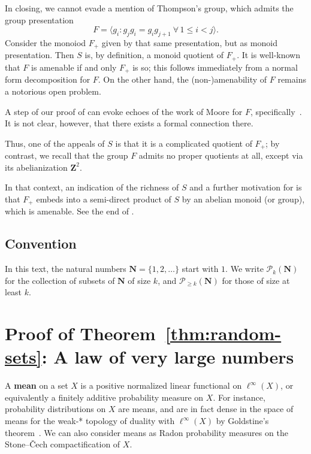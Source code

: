 \documentclass[12pt, pdflatex]{amsart}
\theoremstyle{definition}
\numberwithin{equation}{section}
\numberwithin{theorem}{section}
\newcommand{\NN}{\mathbf{N}}
\newcommand{\ZZ}{\mathbf{Z}}
\newcommand{\sP}{\mathscr{P}}
\begin{document}
\medskip
In closing, we cannot evade a mention of Thompson's group, which admits the group presentation
\begin{equation*}
F = \big\langle g_i : g_j g_i = g_i g_{j+1} \ \forall\, 1\leq i < j  \big\rangle.
\end{equation*}
Consider the monoiod $F_+$ given by that same presentation, but as monoid presentation. Then $S$ is, by definition, a monoid quotient of $F_+$. It is well-known that $F$ is amenable if and only $F_+$ is so; this follows immediately from a normal form decomposition for $F$. On the other hand, the (non-)amenability of $F$ remains a notorious open problem.

A step of our proof of  can evoke echoes of the work of Moore for $F$, specifically~\cites{Moore_hindman,Moore_idem}. It is not clear, however, that there exists a formal connection there.

Thus, one of the appeals of $S$ is that it is a complicated quotient of $F_+$; by contrast, we recall that the group $F$ admits no proper quotients at all, except via its abelianization $\ZZ^2$.

In that context, an indication of the richness of $S$ and a further motivation for  is that $F_+$ embeds into a semi-direct product of $S$ by an abelian monoid (or group), which is amenable. See the end of .



\subsection*{Convention}
In this text, the natural numbers $\NN=\{1, 2, \ldots \}$ start with $1$. We write $\sP_k(\NN)$ for the collection of subsets of $\NN$ of size $k$, and $\sP_{\geq k}(\NN)$ for those of size at least $k$.

\section{Proof of Theorem~\ref{thm:random-sets}: A law of very large numbers}\label{sec:idem}
A \textbf{mean} on a set $X$ is a positive normalized linear functional on $\ell^\infty(X)$, or equivalently a finitely additive probability measure on $X$. For instance, probability distributions on $X$ are means, and are in fact dense in the space of means for the weak-* topology of duality with $\ell^\infty(X)$ by Goldstine's theorem~\cite{Goldstine38}. We can also consider means as Radon probability measures on the Stone--\v{C}ech compactification of $X$.
\end{document}
